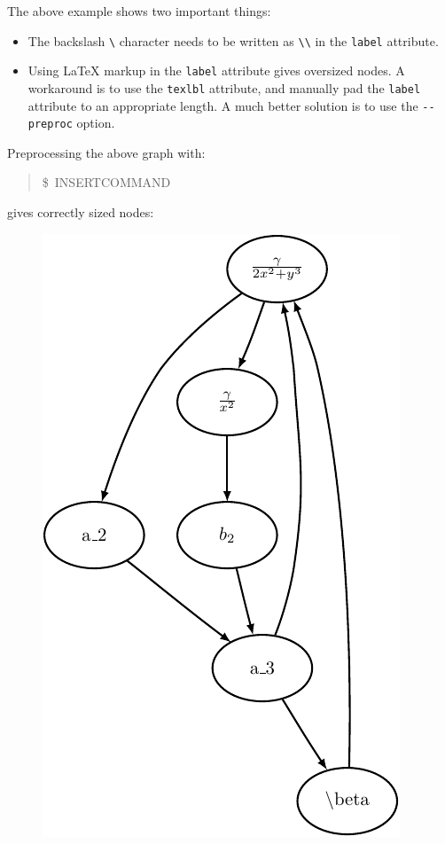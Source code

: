 \documentclass[10pt,a4paper,english]{article}
\begin{document}
The above example shows two important things:
\begin{itemize}
\item {} 
The backslash \texttt{{\textbackslash}} character needs to be written as \texttt{{\textbackslash}{\textbackslash}} in the \texttt{label} attribute.

\item {} 
Using LaTeX markup in the \texttt{label} attribute gives oversized nodes. A workaround  is to use the \texttt{texlbl} attribute, and manually pad the \texttt{label} attribute to an appropriate length. A much better solution is to use the \texttt{-{}-preproc} option.

\end{itemize}

Preprocessing the above graph with:
\begin{quote}{\ttfamily \raggedright \noindent
{\$}~INSERTCOMMAND
}\end{quote}

gives correctly sized nodes:
\begin{figure}[H]
\centering

\includegraphics{pdf/texmodeb}
\end{figure}
\end{document}
